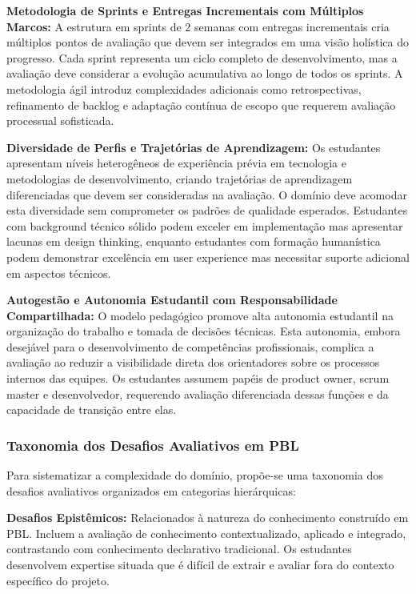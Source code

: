 \documentclass[english, spanish, brazilian]{modelo_dt}
\begin{document}
\textbf{Metodologia de Sprints e Entregas Incrementais com Múltiplos Marcos:} A estrutura em sprints de 2 semanas com entregas incrementais cria múltiplos pontos de avaliação que devem ser integrados em uma visão holística do progresso. Cada sprint representa um ciclo completo de desenvolvimento, mas a avaliação deve considerar a evolução acumulativa ao longo de todos os sprints. A metodologia ágil introduz complexidades adicionais como retrospectivas, refinamento de backlog e adaptação contínua de escopo que requerem avaliação processual sofisticada.

\textbf{Diversidade de Perfis e Trajetórias de Aprendizagem:} Os estudantes apresentam níveis heterogêneos de experiência prévia em tecnologia e metodologias de desenvolvimento, criando trajetórias de aprendizagem diferenciadas que devem ser consideradas na avaliação. O domínio deve acomodar esta diversidade sem comprometer os padrões de qualidade esperados. Estudantes com background técnico sólido podem exceler em implementação mas apresentar lacunas em design thinking, enquanto estudantes com formação humanística podem demonstrar excelência em user experience mas necessitar suporte adicional em aspectos técnicos.

\textbf{Autogestão e Autonomia Estudantil com Responsabilidade Compartilhada:} O modelo pedagógico promove alta autonomia estudantil na organização do trabalho e tomada de decisões técnicas. Esta autonomia, embora desejável para o desenvolvimento de competências profissionais, complica a avaliação ao reduzir a visibilidade direta dos orientadores sobre os processos internos das equipes. Os estudantes assumem papéis de product owner, scrum master e desenvolvedor, requerendo avaliação diferenciada dessas funções e da capacidade de transição entre elas.

\subsubsection{Taxonomia dos Desafios Avaliativos em PBL}

Para sistematizar a complexidade do domínio, propõe-se uma taxonomia dos
desafios avaliativos organizados em categorias hierárquicas:

\textbf{Desafios Epistêmicos:} Relacionados à natureza do conhecimento construído em PBL. Incluem a avaliação de conhecimento contextualizado, aplicado e integrado, contrastando com conhecimento declarativo tradicional. Os estudantes desenvolvem expertise situada que é difícil de extrair e avaliar fora do contexto específico do projeto.
\end{document}
